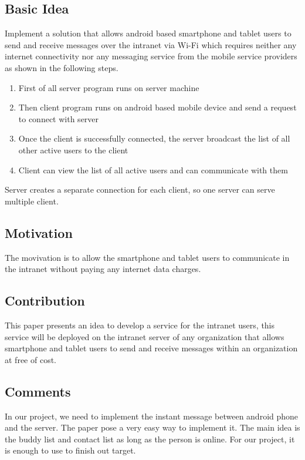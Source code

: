 \documentclass[a4paper]{article}
\begin{document}
    \subsection{Basic Idea}
      Implement a solution that allows android based smartphone and tablet users to send and receive messages over the intranet via Wi-Fi which requires neither any internet connectivity nor any messaging service from the mobile service providers as shown in the following steps.
      \begin{enumerate}
      \item First of all server program runs on server machine
      \item Then client program runs on android based mobile device and send a request to connect with server
      \item Once the client is successfully connected, the server broadcast the list of all other active users to the client
      \item Client can view the list of all active users and can communicate with them
      \end{enumerate}
      Server creates a separate connection for each client, so one server can serve multiple client.

    \subsection{Motivation}
      The movivation is to allow the smartphone and tablet users to communicate in the intranet without paying any internet data charges.

    \subsection{Contribution}
      This paper presents an idea to develop a service for the intranet users, this service will be deployed on the intranet server of any organization that allows smartphone and tablet users to send and receive messages within an organization at free of cost.

    \subsection{Comments}
      In our project, we need to implement the instant message between android phone and the server. The paper pose a very easy way to implement it. The main idea is the buddy list and contact list as long as the person is online. For our project, it is enough to use to finish out target.
      
\end{document}

